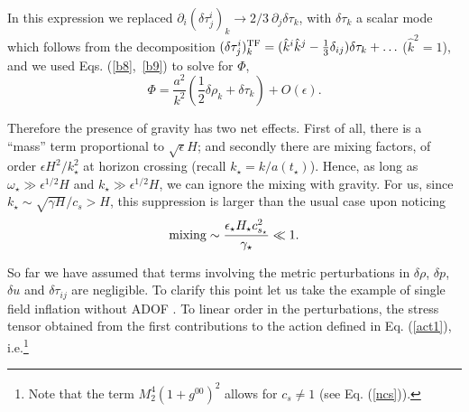 \documentclass[11pt,amsmath,floats,floatfix,nofootinbib,secnumarabic, superscriptaddress, tightenlines]{revtex4}
\newcommand{\beq}{\begin{equation}}
\newcommand{\eeq}{\end{equation}}
\begin{document}
{In this expression we replaced $\partial_i (\delta \tau^i_j)_k \to 2/3~\partial_j \delta \tau_k$, with $\delta\tau_k$ a scalar mode which
follows from the decomposition $(\delta\tau^{i}_{j})^{\rm TF}_k = (\hat k^i\hat k^j-\frac{1}{3}\delta_{ij}) \delta\tau_k + \ldots$ ($\hat k^2=1$),
and we used Eqs. (\ref{b8},~\ref{b9}) to solve for $\Phi$,
\beq
\Phi = \frac{a^2}{k^2} \left(\frac{1}{2}\delta\rho_k + \delta\tau_k\right) + O(\epsilon)\label{Phid}.
\eeq

Therefore the presence of gravity has two net effects. First of all, there is a ``mass'' term proportional to $\sqrt{\epsilon}H$; and secondly there are mixing factors, of order $\epsilon H^2/k_\star^2$
at horizon crossing (recall $k_\star=k/a(t_\star)$). Hence, as long as $\omega_\star \gg \epsilon^{1/2} H$ and $k_\star \gg \epsilon^{1/2} H$,
 we can ignore the mixing with gravity. For us, since $k_\star \sim \sqrt{\gamma H}/c_s > H$, this suppression is larger than the usual case upon noticing
\beq
{\rm mixing} \sim \frac{\epsilon_\star H_\star c_{s_\star}^2}{\gamma_\star} \ll 1 \label{mixingd}.
\eeq

So far we have assumed that terms involving the metric perturbations in  $\delta \rho$, $\delta p$, $\delta u$
and $\delta \tau_{ij}$ are negligible. To clarify this point let us take the example of single field inflation without ADOF \cite{eft1}. To linear order in the perturbations, the stress tensor obtained from the first contributions to the action defined in Eq. (\ref{act1}), i.e.\footnote{Note that the term $M^4_2(1+g^{00})^2$ allows for $c_s\neq 1$ (see Eq. (\ref{ncs})).}

}
\end{document}
